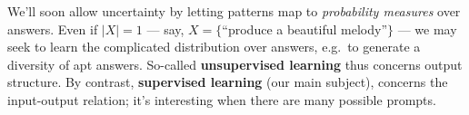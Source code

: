 
        We'll soon allow uncertainty by letting patterns map to
        \emph{probability measures} over answers.
        Even if $|X|=1$ --- say, $X=\{$``produce a beautiful melody''$\}$ ---
        we may seek to learn the complicated distribution over answers,
        e.g.\ to generate a diversity of apt answers.
        So-called \textbf{unsupervised learning} thus concerns output
        structure.  By contrast, \textbf{supervised learning} (our main subject), concerns the input-output
        relation; it's interesting when there are many possible
        prompts.


